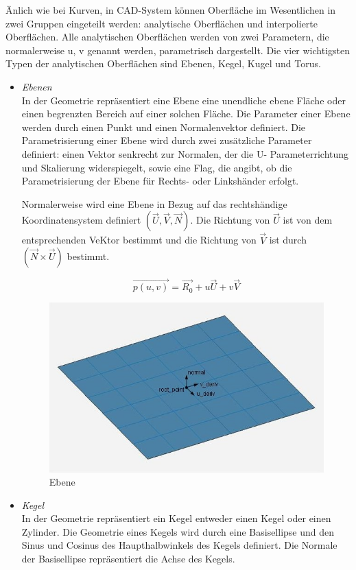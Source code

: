 \documentclass[14pt,a4paper,titlepage]{article}
\begin{document}
\begin{itemize}
				Änlich wie bei Kurven, in CAD-System können Oberfläche im Wesentlichen in zwei Gruppen eingeteilt werden: analytische Oberflächen und interpolierte Oberflächen.
				Alle analytischen Oberflächen werden von zwei Parametern, die normalerweise u, v genannt werden, parametrisch dargestellt. Die vier wichtigsten Typen der analytischen Oberflächen sind Ebenen, Kegel, Kugel und Torus.
			
			\begin{itemize}
				\item \emph{Ebenen}
					\\
					In der Geometrie repräsentiert eine Ebene eine unendliche ebene Fläche oder einen begrenzten Bereich auf einer solchen Fläche.
					Die Parameter einer Ebene werden durch einen Punkt und einen Normalenvektor definiert. Die Parametrisierung einer Ebene wird durch zwei zusätzliche Parameter definiert: einen Vektor senkrecht zur Normalen, der die U- Parameterrichtung und Skalierung widerspiegelt, sowie eine Flag, die angibt, ob die Parametrisierung der Ebene für Rechts- oder Linkshänder erfolgt.
					
					\bigbreak
					Normalerweise wird eine Ebene in Bezug auf das rechtshändige Koordinatensystem definiert \( (\vec{U},\vec{V},\vec{N}) \).
					Die Richtung von \( \vec{U}\) ist von dem entsprechenden VeKtor bestimmt und die Richtung von \( \vec{V}\) ist durch \( (\vec{N}\times\vec{U}) \) bestimmt.
					
					\begin{equation*}
					\vec{p(u,v)} = \vec{R_0} + u\vec{U} + v\vec{V}
					\end{equation*}
					\begin{figure}[h!]
						\centering
						\includegraphics[width=0.5\linewidth]{plane.png}
						\caption{Ebene}
						\label{fig5}
					\end{figure}
				
				\item \emph{Kegel}
					\\
					In der Geometrie repräsentiert ein Kegel entweder einen Kegel oder einen Zylinder. Die Geometrie eines Kegels wird durch eine Basisellipse und den Sinus und Cosinus des Haupthalbwinkels des Kegels definiert. Die Normale der Basisellipse repräsentiert die Achse des Kegels. 


\end{itemize}
\end{itemize}
\end{document}
